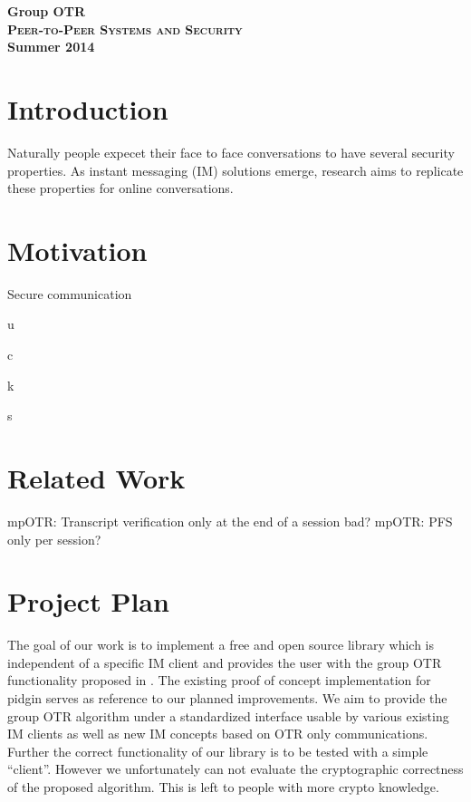 

\title{}
\author{Markus Teich, Jannik Theiß}
\date{\today}



\begin{center}
\huge \textbf{Group OTR} \\
\vspace{2cm}
\LARGE\textbf{\textsc{Peer-to-Peer Systems and Security}}\\
\vspace{0.5cm}
\textbf{Summer 2014}
\vspace{3.5cm}
\end{center}


\section{Introduction}
Naturally people expecet their face to face conversations to have several security properties. As instant messaging (IM) solutions emerge, research aims to replicate these properties for online conversations.


\section{Motivation}
Secure communication 

u

c

k

s

\section{Related Work}

mpOTR: Transcript verification only at the end of a session bad?
mpOTR: PFS only per session?

\section{Project Plan}

The goal of our work is to implement a free and open source library which is
independent of a specific IM client and provides the user with the group OTR
functionality proposed in \cite{impr-gotr}. The existing proof of concept
implementation for pidgin serves as reference to our planned improvements. We
aim to provide the group OTR algorithm under a standardized interface usable by
various existing IM clients as well as new IM concepts based on OTR only
communications. Further the correct functionality of our library is to be tested
with a simple ``client''. However we unfortunately can not evaluate the
cryptographic correctness of the proposed algorithm. This is left to people with
more crypto knowledge.

